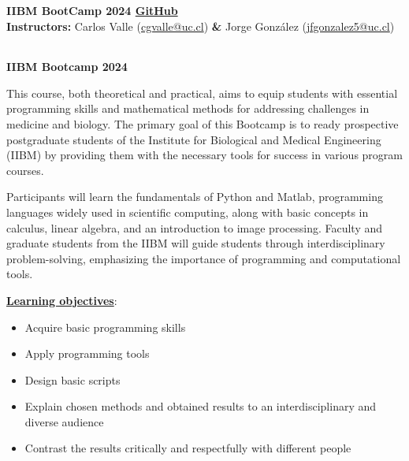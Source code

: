 \documentclass[letter,11pt]{article}
\begin{document}
	\begin{flushleft}\small
		\large{\textbf{IIBM BootCamp 2024 \href{https://github.com/cgvalle/IIBM-BootCamp-2024}{GitHub}}\\
		\textbf{Instructors: } Carlos Valle (\href{mailto:cgvalle@uc.cl}{cgvalle@uc.cl}) \textbf{\&} Jorge González (\href{mailto:jfgonzalez5@uc.cl}{jfgonzalez5@uc.cl}) 
		\hspace{-0.37cm} \begin{tabular}{llllll}

\end{tabular}





\begin{center}
\LARGE\textbf{IIBM Bootcamp 2024}\\
\end{center}



\large
This course, both theoretical and practical, aims to equip students with essential programming skills and mathematical methods for addressing challenges in medicine and biology. The primary goal of this Bootcamp is to ready prospective postgraduate students of the Institute for Biological and Medical Engineering (IIBM) by providing them with the necessary tools for success in various program courses.

Participants will learn the fundamentals of Python and Matlab, programming languages widely used in scientific computing, along with basic concepts in calculus, linear algebra, and an introduction to image processing. Faculty and graduate students from the IIBM will guide students through interdisciplinary problem-solving, emphasizing the importance of programming and computational tools.
\vspace{0.3cm}

\underline{\textbf{Learning objectives}}:
\begin{itemize}
    \itemsep0em
    \item Acquire basic programming skills
    \item Apply programming tools
    \item Design basic scripts
    \item Explain chosen methods and obtained results to an interdisciplinary and diverse audience
    \item Contrast the results critically and respectfully with different people
    

\end{itemize}}
\end{flushleft}
\end{document}

